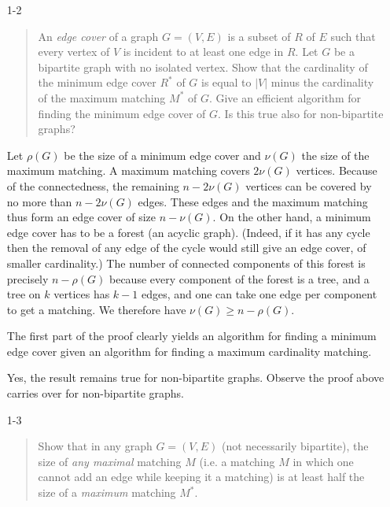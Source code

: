 \documentclass[12pt]{article}
\begin{document}




\begin{enumerate}
\item[1-2] %
\begin{quote}
An {\it edge cover} of a graph $G=(V,E)$ is a subset of $R$ of $E$ such that
every vertex of $V$ is incident to at least one edge in $R$.  Let $G$
be a bipartite graph with no isolated vertex.  Show that the
cardinality of the minimum edge cover $R^*$ of $G$ is equal to $|V|$
minus the cardinality of the maximum matching $M^*$ of $G$.  Give an
efficient algorithm for finding the minimum edge cover of $G$. Is this
true also for non-bipartite graphs? 
\end{quote}

Let $\rho(G)$ be the size of a minimum edge cover
and $\nu(G)$ the size of the maximum matching. A maximum matching
covers $2 \nu(G)$ vertices. Because of the connectedness, the
remaining $n-2\nu(G)$ vertices can be covered by no more than $n
-2\nu(G)$ edges. These edges and the maximum matching thus form an
edge cover of size $n-\nu(G)$. On the other hand, a minimum edge
cover has to be a forest (an acyclic graph). (Indeed, if it has any
cycle then the removal of any edge of the cycle would still give an
edge cover, of smaller cardinality.)  The number of connected
components of this forest is precisely $n - \rho(G)$ because every
component of the forest is a tree, and a tree on $k$ vertices has $k-1$ edges,
and one can take one edge per component to get a matching. We therefore have
$\nu(G) \geq n-\rho(G)$.

The first part of the proof clearly yields an algorithm for finding a minimum edge cover
given an algorithm for finding a maximum cardinality matching.

Yes, the result remains true for non-bipartite graphs.
Observe the proof above carries over for non-bipartite graphs.

%
\item[1-3]
\begin{quote}
Show that in any graph $G=(V,E)$ (not necessarily bipartite), the size
of {\it any maximal} matching $M$ (i.e. a matching $M$ in which one
cannot add an edge while keeping it a matching) is at least half the
size of a {\it maximum} matching $M^*$. 
\end{quote}


\end{enumerate}
\end{document}
